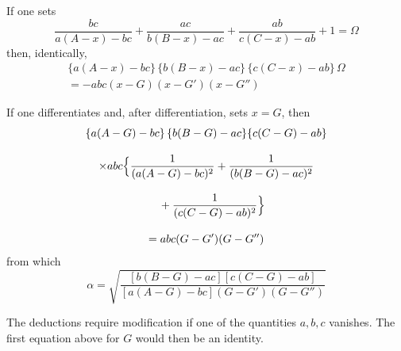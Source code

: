 
If one sets
\[
\frac{bc}{a(A-x)-bc}+\frac{ac}{b(B-x)-ac}+\frac{ab}{c(C-x)-ab}+1=\Omega
\]
then, identically,
\[
\begin{gathered} \{a(A-x)-bc\}\,\{b(B-x)-ac\}\,\{c(C-x)-ab\}\,\Omega\\[9pt] =-abc(x-G)(x-G')(x-G'') \end{gathered}
\]


If one differentiates and, after differentiation, sets $x=G$, then
\[
\begin{gathered} \{a(A-G)-bc\}\,\{b(B-G)-ac\}\{c(C-G)-ab\}\\[9pt] \times abc\Bigl\{\frac{1}{(a(A-G)-bc)^2}+\frac{1}{(b(B-G)-ac)^2}\\[9pt]\quad{}+\frac{1}{(c(C-G)-ab)^2}\Bigr\}\\[9pt] =abc(G-G')(G-G'') \end{gathered}
\]
from which
\[
\alpha=\surd{\frac{[b(B-G)-ac][c(C-G)-ab]}{[a(A-G)-bc](G-G')(G-G'')}}
\]

The deductions require modification if one of the quantities $a,b,c$
vanishes. The first equation above for $G$ would then be an identity.

\clearpage
\endgroup
